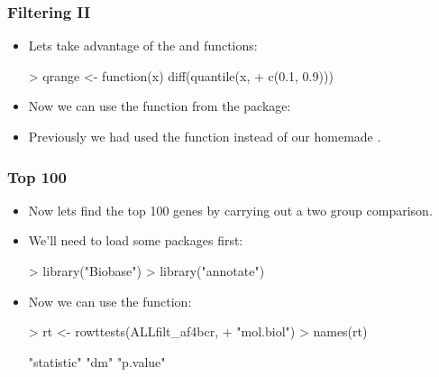 \begin{frame}
  \frametitle{Filtering II}
  \begin{itemize}
  \item Lets take advantage of the  and  functions:
\begin{Schunk}
\begin{Sinput}
> qrange <- function(x) diff(quantile(x, 
+     c(0.1, 0.9)))
\end{Sinput}
\end{Schunk}
  \item Now we can use the  function from the  package:
\begin{Schunk}
\end{Schunk}
  \item Previously we had used the  function instead of our homemade .
  \end{itemize}
\end{frame}

\begin{frame}
  \frametitle{Top 100}
  \begin{itemize}
  \item Now lets find the top 100 genes by carrying out a two group comparison.
  \item We'll need to load some packages first:
\begin{Schunk}
\begin{Sinput}
> library("Biobase")
> library("annotate")
\end{Sinput}
\end{Schunk}
  \item Now we can use the  function:
\begin{Schunk}
\begin{Sinput}
> rt <- rowttests(ALLfilt_af4bcr, 
+     "mol.biol")
> names(rt)
\end{Sinput}
\begin{Soutput}
[1] "statistic" "dm"        "p.value"  
\end{Soutput}
\end{Schunk}
  \end{itemize}
\end{frame}

